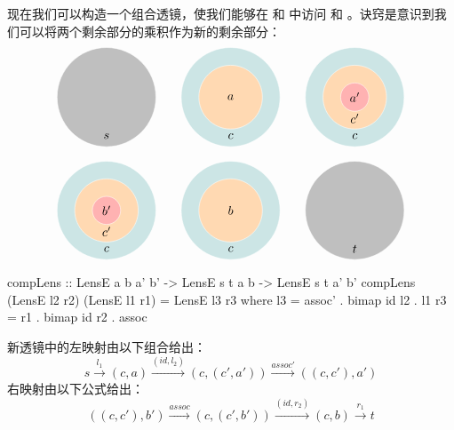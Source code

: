 \documentclass[DaoFP]{subfiles}
\begin{document}
 现在我们可以构造一个组合透镜，使我们能够在  和  中访问  和 。诀窍是意识到我们可以将两个剩余部分的乘积作为新的剩余部分：
 \[
  \begin{tikzpicture}
   \filldraw[fill=gray!50, draw=white] (0, 0) circle (1.4);
   \node at (0, -1.1) {$s$};
  \end{tikzpicture}
  \hspace{20pt}
  \begin{tikzpicture}
   \filldraw[fill=blue!50!green!20, draw=white] (0, 0) circle (1.4);
   \filldraw[fill=orange!30, draw=white] (0, 0) circle (0.9);
   \node at (0, 0) {$a$};
   \node at (0, -1.1) {$c$};
  \end{tikzpicture}
  \hspace{20pt}
  \begin{tikzpicture}
   \filldraw[fill=blue!50!green!20, draw=white] (0, 0) circle (1.4);
   \filldraw[fill=orange!30, draw=white] (0, 0) circle (0.9);
   \filldraw[fill=red!30, draw=white] (0, 0) circle (0.4);
   \node at (0, 0) {$a'$};
   \node at (0, -0.6) {$c'$};
   \node at (0, -1.1) {$c$};
  \end{tikzpicture}
 \]

 \[
  \begin{tikzpicture}
   \filldraw[fill=blue!50!green!20, draw=white] (0, 0) circle (1.4);
   \filldraw[fill=orange!30, draw=white] (0, 0) circle (0.9);
   \filldraw[fill=red!30, draw=white] (0, 0) circle (0.4);
   \node at (0, 0) {$b'$};
   \node at (0, -0.6) {$c'$};
   \node at (0, -1.1) {$c$};
  \end{tikzpicture}
  \hspace{20pt}
  \begin{tikzpicture}
   \filldraw[fill=blue!50!green!20, draw=white] (0, 0) circle (1.4);
   \filldraw[fill=orange!30, draw=white] (0, 0) circle (0.9);
   \node at (0, 0) {$b$};
   \node at (0, -1.1) {$c$};
  \end{tikzpicture}
  \hspace{20pt}
  \begin{tikzpicture}
   \filldraw[fill=gray!50, draw=white] (0, 0) circle (1.4);
   \node at (0, -1.1) {$t$};
  \end{tikzpicture}
 \]



 \begin{haskell}
  compLens :: LensE a b a' b' -> LensE s t a b -> LensE s t a' b'
  compLens (LensE l2 r2) (LensE l1 r1) = LensE l3 r3
  where l3 = assoc' . bimap id l2  . l1
  r3 = r1 . bimap id r2 . assoc
 \end{haskell}
 新透镜中的左映射由以下组合给出：
 \[ s \xrightarrow{l_1} (c, a)   \xrightarrow{(id, l_2)} (c, (c', a'))  \xrightarrow{assoc'} ((c, c'), a')\]
 右映射由以下公式给出：
 \[ ((c, c'), b') \xrightarrow{assoc}  (c, (c', b')) \xrightarrow{(id, r_2)} (c, b) \xrightarrow{r_1} t \]
\end{document}
